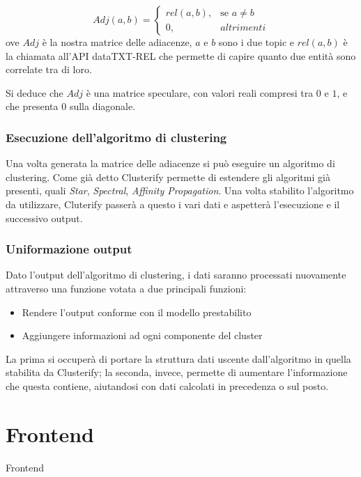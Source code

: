 			\begin{equation*}
				Adj(a, b) = \begin{cases} 
					rel(a,b), & \mbox{se } a \neq b \\ 
					0, & altrimenti 
				\end{cases}
			\end{equation*}
			ove $Adj$ è la nostra matrice delle adiacenze, $a$ e $b$ sono i due topic e $rel(a,b)$ è la chiamata all'API dataTXT-REL che permette di capire quanto due entità sono correlate tra di loro.
			
			Si deduce che $Adj$ è una matrice speculare, con valori reali compresi tra $0$ e $1$, e che presenta $0$ sulla diagonale.

		\subsubsection{Esecuzione dell'algoritmo di clustering}
			Una volta generata la matrice delle adiacenze si può eseguire un algoritmo di clustering. Come già detto Clusterify permette di estendere gli algoritmi già presenti, quali \emph{Star}, \emph{Spectral}, \emph{Affinity Propagation}. Una volta stabilito l'algoritmo da utilizzare, Cluterify passerà a questo i vari dati e aspetterà l'esecuzione e il successivo output.

		\subsubsection{Uniformazione output}
			Dato l'output dell'algoritmo di clustering, i dati saranno processati nuovamente attraverso una funzione votata a due principali funzioni:
			\begin{itemize}
  				\item Rendere l'output conforme con il modello prestabilito
	  			\item Aggiungere informazioni ad ogni componente del cluster
 			\end{itemize} 
			
			La prima si occuperà di portare la struttura dati uscente dall'algoritmo in quella stabilita da Clusterify; la seconda, invece, permette di aumentare l'informazione che questa contiene, aiutandosi con dati calcolati in precedenza o sul posto.

\section{Frontend}
	Frontend
